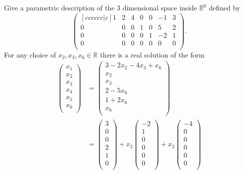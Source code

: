 \begin{example}
    Give a parametric description of the 3 dimensional space inside $\mathbb R^6$ defined by
    \[
        \begin{pmatrix}[cccccc|c]
            1&2&4&0&0&-1&3\\
            0&0&0&1&0&5&2\\
            0&0&0&0&1&-2&1\\
            0&0&0&0&0&0&0\\
        \end{pmatrix}
        .
    \]
    For any choice of $x_2,x_3,x_6\in\mathbb R$ there is a real solution of the form
    \begin{align*}
        \begin{pmatrix}
            x_1\\x_2\\x_3\\x_4\\x_5\\x_6\\
        \end{pmatrix}
        &=\begin{pmatrix}
            3-2x_2-4x_3+x_6\\
            x_2\\
            x_3\\
            2-5x_6\\
            1+2x_6\\
            x_6\\
        \end{pmatrix}
        \\
        &=\begin{pmatrix}
            3\\0\\0\\2\\1\\0\\
        \end{pmatrix}
        +x_2\begin{pmatrix}
            -2\\1\\0\\0\\0\\0\\
        \end{pmatrix}
        +x_3\begin{pmatrix}
            -4\\0\\0\\0\\0\\0\\

\end{pmatrix}
\end{align*}
\end{example}
